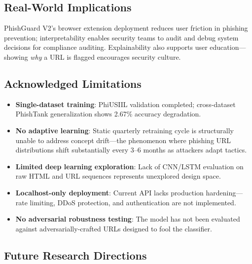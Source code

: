 \documentclass[conference]{IEEEtran}
\begin{document}
\subsection{Real-World Implications}

PhishGuard V2's browser extension deployment reduces user friction in phishing prevention; interpretability enables security teams to audit and debug system decisions for compliance auditing. Explainability also supports user education—showing \textit{why} a URL is flagged encourages security culture.

\subsection{Acknowledged Limitations}

\begin{itemize}
\item \textbf{Single-dataset training}: PhiUSIIL validation completed; cross-dataset PhishTank generalization shows 2.67\% accuracy degradation.
\item \textbf{No adaptive learning}: Static quarterly retraining cycle is structurally unable to address concept drift—the phenomenon where phishing URL distributions shift substantially every 3–6 months as attackers adapt tactics.
\item \textbf{Limited deep learning exploration}: Lack of CNN/LSTM evaluation on raw HTML and URL sequences represents unexplored design space.
\item \textbf{Localhost-only deployment}: Current API lacks production hardening—rate limiting, DDoS protection, and authentication are not implemented.
\item \textbf{No adversarial robustness testing}: The model has not been evaluated against adversarially-crafted URLs designed to fool the classifier.
\end{itemize}

\subsection{Future Research Directions}
\end{document}
